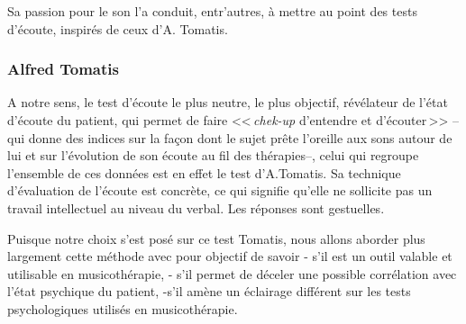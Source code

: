Sa passion pour le son l'a conduit, entr'autres, à mettre au point des tests
d'écoute, inspirés de ceux d'A. Tomatis.
       
\subsubsection{Alfred Tomatis}


A notre sens, le  test d'écoute le plus neutre, le plus objectif, révélateur de l'état d'écoute
du patient, qui permet de faire <<\,\emph{chek-up} d'entendre et d'écouter\,>>
 --qui donne des indices sur la façon dont le sujet prête l'oreille
 aux sons autour de lui et sur l'évolution de son écoute au fil des thérapies--,
celui qui regroupe l'ensemble de ces
données est en effet le test d'A.Tomatis.
Sa technique d'évaluation
de l'écoute est concrète, ce qui signifie qu'elle ne
sollicite pas un travail intellectuel au niveau du verbal.
Les réponses sont gestuelles.

Puisque notre choix s'est posé sur ce test Tomatis, nous allons
aborder plus largement cette méthode avec pour objectif de savoir
- s'il est un outil valable et utilisable en musicothérapie,
- s'il permet de déceler une possible corrélation avec l'état
psychique du patient,
-s'il amène un éclairage différent sur les tests psychologiques
utilisés en musicothérapie.

